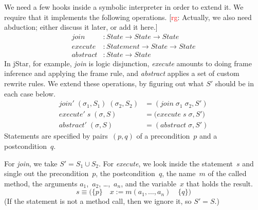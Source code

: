 \documentclass[a4paper]{article}
\newcommand{\rg}[1]{\todo{rg}{#1}}
\newcommand{\todo}[2]{{\small [\textcolor{red}{#1}: #2]}}
\theoremstyle{slanted}
\theoremstyle{definition}
\theoremstyle{remark}
\begin{document}
We need a few hooks inside a symbolic interpreter in order to extend it.
We require that it implements the following operations.
\rg{Actually, we also need abduction; either discuss it later, or add it here.}
\begin{align}
\mathit{join} &: \mathit{State} \to \mathit{State} \to \mathit{State} \\
\mathit{execute} &: \mathit{Statement} \to \mathit{State} \to \mathit{State} \\
\mathit{abstract} &: \mathit{State} \to \mathit{State}
\end{align}
In jStar, for example, \textit{join} is logic disjunction, \textit{execute} amounts to doing frame inference and applying the frame rule, and \textit{abstract} applies a set of custom rewrite rules.
We extend these operations, by figuring out what $S'$ should be in each case below.
\begin{align}
\mathit{join}'\;(\sigma_1, S_1)\;(\sigma_2,S_2) &=
    (\mathit{join}\;\sigma_1\;\sigma_2, S') \\
\mathit{execute}'\;s\;(\sigma,S) &=
    \bigl(\mathit{execute}\;s\;\sigma,S'\bigr) \\
\mathit{abstract}'\;(\sigma,S) &=
    (\mathit{abstract}\;\sigma,S')
\end{align}
Statements are specified by pairs~$(p,q)$ of a precondition~$p$ and a postcondition~$q$.

For \textit{join}, we take $S'=S_1\cup S_2$.
For \textit{execute}, we look inside the statement~$s$ and single out the precondition~$p$, the postcondition~$q$, the name~$m$ of the called method, the arguments $a_1$,~$a_2$, \dots,~$a_n$, and the variable~$x$ that holds the result.
\[ s \equiv \bigl(\{p\}\quad x := m(a_1,\ldots,a_n)\quad \{q\}\bigr) \]
(If the statement is not a method call, then we ignore it, so $S'=S$.)



\end{document}
